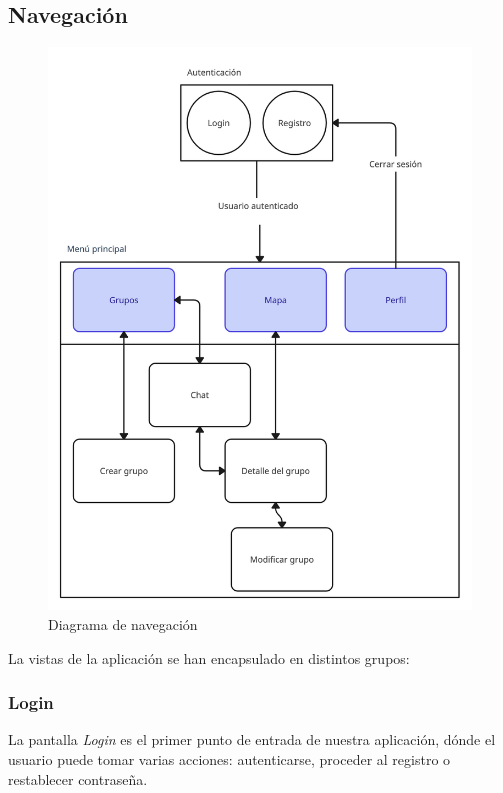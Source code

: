 \subsection{Navegación}
\begin{figure}[H]
        \centering
        \includegraphics[width=1\linewidth]{images/navegacion.png}
        \caption{Diagrama de navegación}
        \label{fig:diagramaER}
\end{figure}
La vistas de la aplicación se han encapsulado en distintos grupos:

\subsubsection{Login}
La pantalla \textit{Login} es el primer punto de entrada de nuestra aplicación, dónde el usuario puede tomar varias acciones: autenticarse, proceder al registro o restablecer contraseña.

